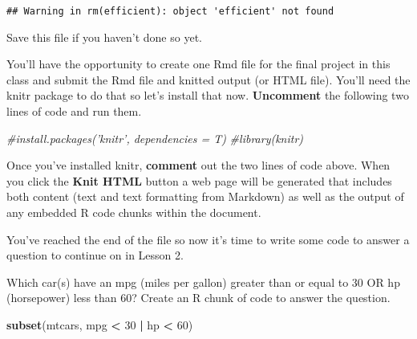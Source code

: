 \documentclass[]{article}
\newenvironment{Shaded}{\begin{snugshade}}{\end{snugshade}}
\newcommand{\KeywordTok}[1]{\textcolor[rgb]{0.13,0.29,0.53}{\textbf{#1}}}
\newcommand{\DecValTok}[1]{\textcolor[rgb]{0.00,0.00,0.81}{#1}}
\newcommand{\StringTok}[1]{\textcolor[rgb]{0.31,0.60,0.02}{#1}}
\newcommand{\CommentTok}[1]{\textcolor[rgb]{0.56,0.35,0.01}{\textit{#1}}}
\newcommand{\OperatorTok}[1]{\textcolor[rgb]{0.81,0.36,0.00}{\textbf{#1}}}
\newcommand{\NormalTok}[1]{#1}
\begin{document}
\begin{verbatim}
## Warning in rm(efficient): object 'efficient' not found
\end{verbatim}

Save this file if you haven't done so yet.

You'll have the opportunity to create one Rmd file for the final project
in this class and submit the Rmd file and knitted output (or HTML file).
You'll need the knitr package to do that so let's install that now.
\textbf{Uncomment} the following two lines of code and run them.

\begin{Shaded}
\begin{Highlighting}[]
\CommentTok{#install.packages('knitr', dependencies = T)}
\CommentTok{#library(knitr)}
\end{Highlighting}
\end{Shaded}

Once you've installed knitr, \textbf{comment} out the two lines of code
above. When you click the \textbf{Knit HTML} button a web page will be
generated that includes both content (text and text formatting from
Markdown) as well as the output of any embedded R code chunks within the
document.

You've reached the end of the file so now it's time to write some code
to answer a question to continue on in Lesson 2.

Which car(s) have an mpg (miles per gallon) greater than or equal to 30
OR hp (horsepower) less than 60? Create an R chunk of code to answer the
question.

\begin{Shaded}
\begin{Highlighting}[]
\KeywordTok{subset}\NormalTok{(mtcars, mpg }\OperatorTok{<}\StringTok{ }\DecValTok{30} \OperatorTok{|}\StringTok{ }\NormalTok{hp }\OperatorTok{<}\StringTok{ }\DecValTok{60}\NormalTok{)}
\end{Highlighting}
\end{Shaded}
\end{document}
